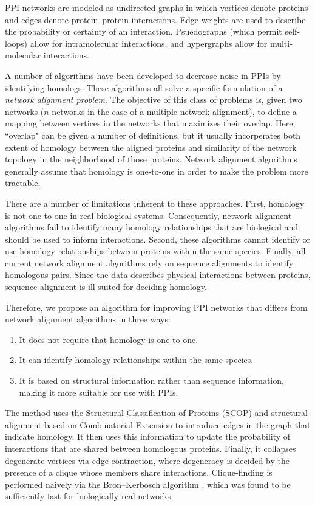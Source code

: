 \documentclass[12pt,twoside]{article}
\def\NI{\noindent}
\def\NS{
	\setlength{\itemsep}{0.1em}
	\setlength{\parskip}{0em}
	\setlength{\parsep}{0em}
}
\def\RS{
	\setlength{\itemsep}{0em}
	\setlength{\parskip}{0.4em}
	\setlength{\parsep}{0em}
}
\begin{document}
\NI PPI networks are modeled as undirected graphs in which vertices denote proteins and edges denote protein--protein interactions. Edge weights are used to describe the probability or certainty of an interaction. Psuedographs (which permit self-loops) allow for intramolecular interactions, and hypergraphs allow for multi-molecular interactions.

\NI A number of algorithms have been developed to decrease noise in PPIs by identifying homologs. These algorithms all solve a specific formulation of a \emph{network alignment problem}. The objective of this class of problems is, given two networks ($n$ networks in the case of a multiple network alignment), to define a mapping between vertices in the networks that maximizes their overlap. Here, ``overlap" can be given a number of definitions, but it usually incorperates both extent of homology between the aligned proteins and similarity of the network topology in the neighborhood of those proteins. Network alignment algorithms generally assume that homology is one-to-one in order to make the problem more tractable.

\NI There are a number of limitations inherent to these approaches. First, homology is not one-to-one in real biological systems. Consequently, network alignment algorithms fail to identify many homology relationships that are biological and should be used to inform interactions. Second, these algorithms cannot identify or use homology relationships between proteins within the same species. Finally, all current network alignment algorithms rely on sequence alignments to identify homologous pairs. Since the data describes physical interactions between proteins, sequence alignment is ill-suited for deciding homology.

\NI Therefore, we propose an algorithm for improving PPI networks that differs from network alignment algorithms in three ways:
\NS
\begin{enumerate}
\NS
\item It does not require that homology is one-to-one.
\item It can identify homology relationships within the same species.
\item It is based on structural information rather than sequence information, making it more suitable for use with PPIs.
\end{enumerate}

\NI The method uses the Structural Classification of Proteins (SCOP) \cite{scop} and structural alignment based on Combinatorial Extension \cite{ce} to introduce edges in the graph that indicate homology. It then uses this information to update the probability of interactions that are shared between homologous proteins. Finally, it collapses degenerate vertices via edge contraction, where degeneracy is decided by the presence of a clique whose members share interactions. Clique-finding is performed naively via the Bron--Kerbosch algorithm \cite{bron}, which was found to be sufficiently fast for biologically real networks.\RS
\end{document}
